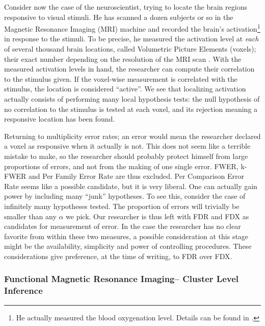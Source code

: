 \documentclass[review,12pt]{article}
\theoremstyle{definition}
\theoremstyle{definition}
\begin{document}
Consider now the case of the neuroscientist, trying to locate the brain regions responsive to visual stimuli. He has scanned a dozen subjects or so in the Magnetic Resonance Imaging (MRI) machine and recorded the brain's activation\footnote{ He actually measured the blood oxygenation level. Details can be found in \cite{lazar_statistical_2008}.} in response to the stimuli. To be precise, he measured the activation level at \emph{each} of several thousand brain locations, called Volumetric Picture Elements (voxels); their exact number depending on the resolution of the MRI scan . With the measured activation levels in hand, the researcher can compute their correlation to the stimulus given. If the voxel-wise measurement is correlated with the stimulus, the location is considered ``active''. We see that localizing activation actually consists of performing many local hypothesis tests: the null hypothesis of no correlation to the stimulus is tested at each voxel, and its rejection meaning a responsive location has been found.

Returning to multiplicity error rates; an error would mean the researcher declared a voxel as responsive when it actually is not. This does not seem like a terrible mistake to make, so the researcher should probably protect himself from large proportions of errors, and not from the making of one single error. FWER, k-FWER and Per Family Error Rate are thus excluded. Per Comparison Error Rate seems like a possible candidate, but it is very liberal. One can actually gain power by including many ``junk'' hypotheses. To see this, consider the case of infinitely many hypotheses tested. The proportion of errors will trivially be smaller than any $\alpha$ we pick. Our researcher is thus left with FDR and FDX as candidates for measurement of error. 
In the case the researcher has no clear favorite from within these two measures, a possible consideration at this stage might be the availability, simplicity and power of controlling procedures. These considerations give preference, at the time of writing, to FDR over FDX. 


\subsubsection{Functional Magnetic Resonance Imaging-- Cluster Level Inference}
\end{document}
